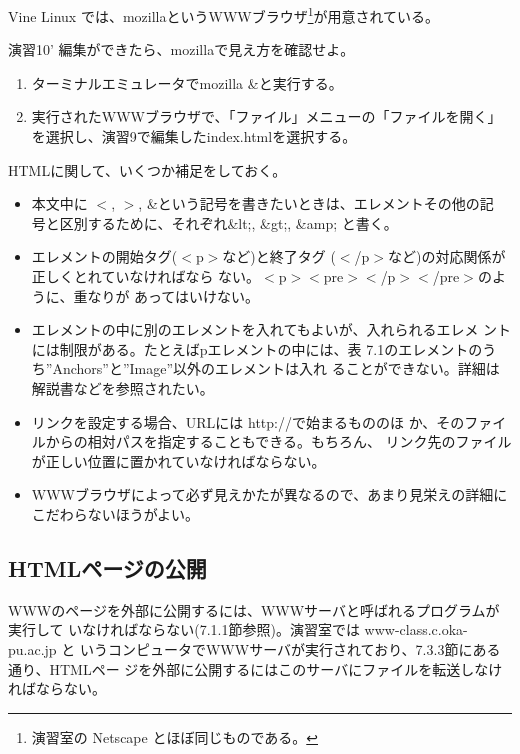 \documentclass[a4j,10pt]{jarticle}
\begin{document}
Vine Linux では、{\sffamily mozilla}というWWWブラウザ\footnote{演習室の 
Netscape とほぼ同じものである。}が用意されている。
\begin{itembox}{演習10'}
編集ができたら、{\sffamily mozilla}で見え方を確認せよ。
\begin{enumerate}
 \item ターミナルエミュレータで{\sffamily mozilla \&}と実行する。
 \item 実行されたWWWブラウザで、「ファイル」メニューの「ファイルを開く」
       を選択し、演習9で編集した{\sffamily index.html}を選択する。
\end{enumerate}
\end{itembox}

HTMLに関して、いくつか補足をしておく。
\begin{itemize}
 \item 本文中に $<$, $>$, \&という記号を書きたいときは、エレメントその他の記
       号と区別するために、それぞれ\&lt;, \&gt;, \&amp; と書く。 
 \item エレメントの開始タグ({\sffamily $<$p$>$}など)と終了タグ
       ({\sffamily $<$/p$>$}など)の対応関係が正しくとれていなければなら
       ない。{\sffamily $<$p$><$pre$><$/p$><$/pre$>$}のように、重なりが
       あってはいけない。
 \item エレメントの中に別のエレメントを入れてもよいが、入れられるエレメ
       ントには制限がある。たとえば{\sffamily p}エレメントの中には、表
       7.1のエレメントのうち''Anchors''と''Image''以外のエレメントは入れ
       ることができない。詳細は解説書などを参照されたい。
 \item リンクを設定する場合、URLには {\sffamily http://}で始まるもののほ
       か、そのファイルからの相対パスを指定することもできる。もちろん、
       リンク先のファイルが正しい位置に置かれていなければならない。
 \item WWWブラウザによって必ず見えかたが異なるので、あまり見栄えの詳細に
       こだわらないほうがよい。
\end{itemize}

\subsection{HTMLページの公開}
WWWのページを外部に公開するには、WWWサーバと呼ばれるプログラムが実行して
いなければならない(7.1.1節参照)。演習室では www-class.c.oka-pu.ac.jp と
いうコンピュータでWWWサーバが実行されており、7.3.3節にある通り、HTMLペー
ジを外部に公開するにはこのサーバにファイルを転送しなければならない。
\end{document}
